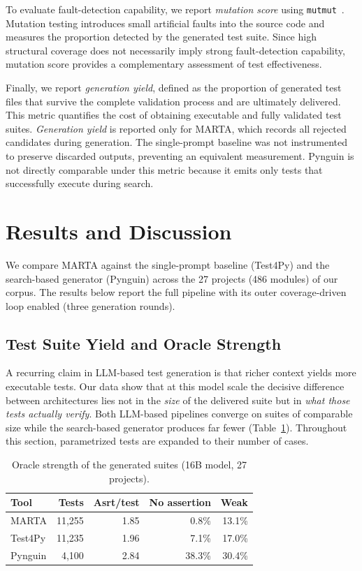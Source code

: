 \documentclass{llncs}
\begin{document}
To evaluate fault-detection capability, we report \emph{mutation score} using \texttt{mutmut}~\cite{mutmut}. Mutation testing introduces small artificial faults into the source code and measures the proportion detected by the generated test suite. Since high structural coverage does not necessarily imply strong fault-detection capability, mutation score provides a complementary assessment of test effectiveness.

Finally, we report \emph{generation yield}, defined as the proportion of generated test files that survive the complete validation process and are ultimately delivered. This metric quantifies the cost of obtaining executable and fully validated test suites. \emph{Generation yield} is reported only for MARTA, which records all rejected candidates during generation. The single-prompt baseline was not instrumented to preserve discarded outputs, preventing an equivalent measurement. Pynguin is not directly comparable under this metric because it emits only tests that successfully execute during search.



\section{Results and Discussion}
\label{sec:res}

We compare MARTA against the single-prompt baseline (Test4Py) and the search-based
generator (Pynguin) across the 27 projects (486 modules) of our corpus.  The results below report the full
pipeline with its outer coverage-driven loop enabled (three generation rounds).

\subsection{Test Suite Yield and Oracle Strength}
\label{sec:oracles}

A recurring claim in LLM-based test generation is that richer context yields more
executable tests. Our data show that at this model scale the decisive difference
between architectures lies not in the \emph{size} of the delivered suite but in
\emph{what those tests actually verify}. Both LLM-based pipelines converge on
suites of comparable size while the search-based generator produces far fewer
(Table~\ref{tab:oracles}). Throughout this section, parametrized tests are expanded
to their number of cases.

\begin{table}[H]
\centering
\caption{Oracle strength of the generated suites (16B model, 27 projects).}
\label{tab:oracles}
\begin{tabular}{lrrrr}
\toprule
Tool & Tests & Asrt/test & No assertion & Weak \\
\midrule
MARTA    & 11{,}255 & 1.85 & 0.8\%  & 13.1\% \\
Test4Py  & 11{,}235 & 1.96 & 7.1\%  & 17.0\% \\
Pynguin  &  4{,}100 & 2.84 & 38.3\% & 30.4\% \\
\bottomrule
\end{tabular}
\end{table}
\end{document}
